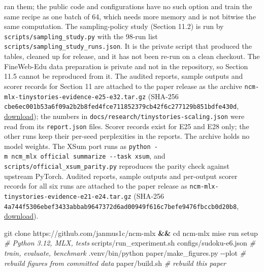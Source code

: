 \documentclass[
  british,
]{article}
\newenvironment{Shaded}{}{}
\newcommand{\AttributeTok}[1]{\textcolor[rgb]{0.49,0.56,0.16}{#1}}
\newcommand{\BuiltInTok}[1]{\textcolor[rgb]{0.00,0.50,0.00}{#1}}
\newcommand{\CommentTok}[1]{\textcolor[rgb]{0.38,0.63,0.69}{\textit{#1}}}
\newcommand{\ExtensionTok}[1]{#1}
\newcommand{\FunctionTok}[1]{\textcolor[rgb]{0.02,0.16,0.49}{#1}}
\newcommand{\KeywordTok}[1]{\textcolor[rgb]{0.00,0.44,0.13}{\textbf{#1}}}
\newcommand{\NormalTok}[1]{#1}
\begin{document}
ran them; the public code and configurations have no such option and
train the same recipe as one batch of 64, which needs more memory and is
not bitwise the same computation. The sampling-policy study (Section
11.2) is run by \texttt{scripts/sampling\_study.py} with the 98-run list
\texttt{scripts/sampling\_study\_runs.json}. It is the private script
that produced the tables, cleaned up for release, and it has not been
re-run on a clean checkout. The FineWeb-Edu data preparation is private
and not in the repository, so Section 11.5 cannot be reproduced from it.
The audited reports, sample outputs and scorer records for Section 11
are attached to the paper release as the archive
\texttt{ncm-mlx-tinystories-evidence-e25-e32.tar.gz} (SHA-256
\texttt{cbe6ec001b53a6f09a2b2b8fed4fce711852379cb42f6c277129b851bdfe430d},
\href{https://github.com/janmus1c/ncm-mlx/releases/download/paper-v0.13/ncm-mlx-tinystories-evidence-e25-e32.tar.gz}{download});
the numbers in \texttt{docs/research/tinystories-scaling.json} were read
from its \texttt{report.json} files. Scorer records exist for E25 and
E28 only; the other runs keep their per-seed perplexities in the
reports. The archive holds no model weights. The XSum port runs as
\texttt{python\ -m\ ncm\_mlx\ official\ summarize\ -\/-task\ xsum}, and
\texttt{scripts/official\_xsum\_parity.py} reproduces the parity check
against upstream PyTorch. Audited reports, sample outputs and per-output
scorer records for all six runs are attached to the paper release as
\texttt{ncm-mlx-tinystories-evidence-e21-e24.tar.gz} (SHA-256
\texttt{4a744f5306ebef3433abbab9647372d6ad00949f616c7befe9476fbccb0d20b8},
\href{https://github.com/janmus1c/ncm-mlx/releases/download/paper-v0.12/ncm-mlx-tinystories-evidence-e21-e24.tar.gz}{download}).

\begin{Shaded}
\begin{Highlighting}[]
\FunctionTok{git}\NormalTok{ clone https://github.com/janmus1c/ncm{-}mlx }\KeywordTok{\&\&} \BuiltInTok{cd}\NormalTok{ ncm{-}mlx}
\ExtensionTok{mise}\NormalTok{ run setup                                     }\CommentTok{\# Python 3.12, MLX, tests}
\ExtensionTok{scripts/run\_experiment.sh}\NormalTok{ configs/sudoku{-}e6.json   }\CommentTok{\# train, evaluate, benchmark}
\ExtensionTok{.venv/bin/python}\NormalTok{ paper/make\_figures.py }\AttributeTok{{-}{-}plot}      \CommentTok{\# rebuild figures from committed data}
\ExtensionTok{paper/build.sh}                                     \CommentTok{\# rebuild this paper}
\end{Highlighting}
\end{Shaded}
\end{document}
